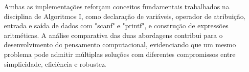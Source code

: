 \documentclass[12pt, a4paper]{article}
\begin{document}
Ambas as implementações reforçam conceitos fundamentais trabalhados na disciplina de Algoritmos I, como declaração de variáveis, operador de atribuição, entrada e saída de dados com "scanf" e "printf", e construção de expressões aritméticas. A análise comparativa das duas abordagens contribui para o desenvolvimento do pensamento computacional, evidenciando que um mesmo problema pode admitir múltiplas soluções com diferentes compromissos entre simplicidade, eficiência e robustez.


\end{document}
